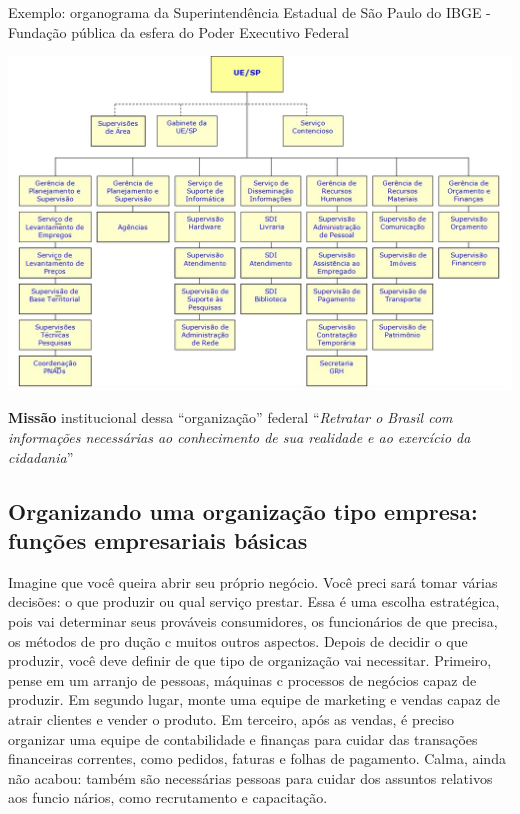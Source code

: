 \documentclass[
]{book}
\begin{document}
Exemplo: organograma da Superintendência Estadual de São Paulo do IBGE - Fundação pública da esfera do Poder Executivo Federal

\includegraphics{images/organogramas/SES-SP.jpg}

\textbf{Missão} institucional dessa ``organização'' federal ``\emph{Retratar o Brasil com informações necessárias ao conhecimento de sua realidade e ao exercício da cidadania}''

\subsection{Organizando uma organização tipo empresa: funções empresariais básicas}\label{organizando-uma-organizauxe7uxe3o-tipo-empresa-funuxe7uxf5es-empresariais-buxe1sicas}

Imagine que você queira abrir seu próprio negócio. Você preci­ sará tomar várias decisões: o que produzir ou qual serviço prestar. Essa é uma escolha estratégica, pois vai determinar seus prováveis consumidores, os funcionários de que precisa, os métodos de pro­ dução c muitos outros aspectos. Depois de decidir o que produzir, você deve definir de que tipo de organização vai necessitar. Primeiro, pense em um arranjo de pessoas, máquinas c processos de negócios capaz de produzir. Em segundo lugar, monte uma equipe de marketing e vendas capaz de atrair clientes e vender o produto. Em terceiro, após as vendas, é preciso organizar uma equipe de contabilidade e finanças para cuidar das transações financeiras correntes, como pedidos, faturas e folhas de pagamento. Calma, ainda não acabou: também são necessárias pessoas para cuidar dos assuntos relativos aos funcio­ nários, como recrutamento e capacitação.
\end{document}
